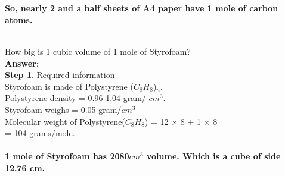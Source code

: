 \documentclass[11pt]{exam}
\begin{document}
\begin{questions}
 \\ \\
\textbf{So, nearly 2 and a half sheets of A4 paper have 1 mole of carbon atoms.} \\ \\



\question
\label{Q5:Styrofoam}

How big is 1 cubic volume of 1 mole of Styrofoam?\\
\textbf{Answer}: \\
\textbf{Step 1}. Required information \\
Styrofoam is made of Polystyrene ($C_{8}H_{8}$)$_{n}$. \\
Polystyrene density = 0.96-1.04 gram/ $cm^{3}$.\\
Styrofoam weighs = 0.05 gram/$cm^{3}$ \\
Molecular weight of Polystyrene($C_{8}H_{8}$) = 12 $\times$ 8 + 1 $\times$ 8\\ = 104 grams/mole.\\ 

 \\ 

\textbf{1 mole of Styrofoam has 2080$cm^{3}$ volume. Which is a cube of side 12.76 cm.} \\


\question
\label{Q6:Diamond}


\end{questions}
\end{document}
